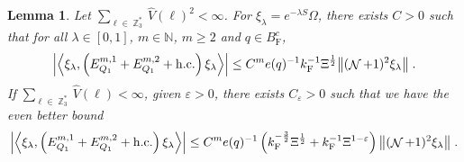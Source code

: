 \documentclass[12pt,a4paper]{article}
\numberwithin{equation}{section}
\newcommand{\NNN}{\mathbb{N}}
\newcommand{\1}{\mathbb{I}}
\newcommand{\F}{\mathrm{F}}
\DeclareMathOperator{\Z}{\mathbb{Z}}
\DeclareMathOperator{\NN}{\mathcal{N}}
\newcommand{\half}{\frac{1}{2}}
\newcommand{\eva}[1]{\left\langle #1 \right\rangle}
\theoremstyle{plain}
\newtheorem{lemma}[theorem]{Lemma}
\theoremstyle{definition}
\theoremstyle{remark}
\theoremstyle{plain}
\theoremstyle{definition}
\theoremstyle{remark}
\begin{document}
\begin{lemma} \label{lem:EQ111}
Let $ \sum_{\ell \in \Z_3^*} \hat{V}(\ell)^2 < \infty $. For $\xi_\lambda = e^{-\lambda S} \Omega$, there exists $ C > 0 $ such that for all $ \lambda \in [0,1] $, $ m \in \NNN $, $ m \ge 2 $ and $ q \in B_{\F}^c $,
\begin{equation} \label{eq:estEQ111_Coulomb}
\begin{aligned}
	\abs{\eva{\xi_\lambda,\left(E^{m,1}_{Q_1}+E^{m,2}_{Q_1}+\mathrm{h.c.}\right) \xi_\lambda }} 
	\leq C^m e(q)^{-1}
		k_{\F}^{-1} \Xi^{\half}
		\norm{ (\NN+1)^2 \xi_\lambda} \;.
\end{aligned}
\end{equation}
If $ \sum_{\ell \in \Z_3^*} \hat{V}(\ell) < \infty $, given $ \varepsilon > 0 $, there exists $ C_\varepsilon > 0 $ such that we have the even better bound
\begin{equation} \label{eq:estEQ111}
\begin{aligned}
	\abs{\eva{\xi_\lambda,\left(E^{m,1}_{Q_1}+E^{m,2}_{Q_1}+\mathrm{h.c.}\right) \xi_\lambda }} 
	\leq C^m e(q)^{-1} \left(
		k_{\F}^{-\frac{3}{2}} \Xi^\half
		+ k_{\F}^{-1}\Xi^{1-\varepsilon} \right)
		\norm{ (\NN+1)^2 \xi_\lambda} \;.
\end{aligned}
\end{equation}
\end{lemma}
\end{document}
